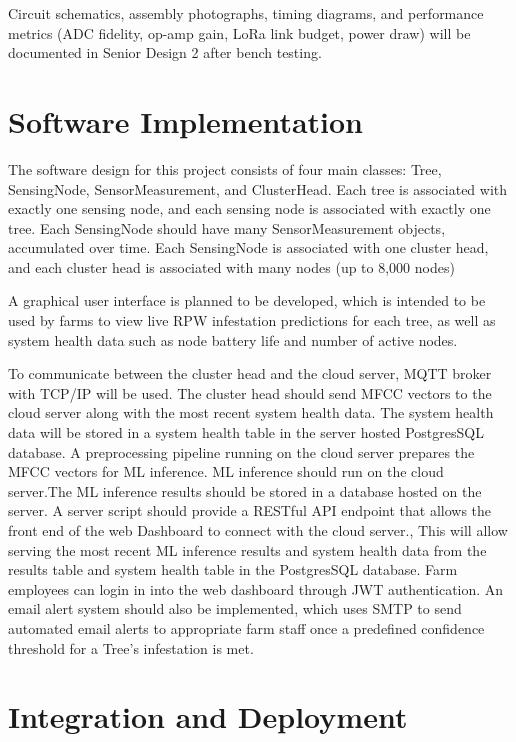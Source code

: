 \documentclass[12pt,a4paper,oneside]{memoir}
\begin{document}
Circuit schematics, assembly photographs, timing diagrams, and performance metrics (ADC fidelity, op-amp gain, LoRa link budget, power draw) will be documented in Senior Design 2 after bench testing.

\section{Software Implementation}
\label{sec:SoftwareImplementation}


The software design for this project consists of four main classes: Tree, SensingNode, SensorMeasurement, and ClusterHead. Each tree is associated with exactly one sensing node, and each sensing node is associated with exactly one tree. Each SensingNode should have many SensorMeasurement objects, accumulated over time. Each SensingNode is associated with one cluster head, and each cluster head is associated with many nodes (up to 8,000 nodes)

A graphical user interface is planned to be developed, which is intended to be used by farms to view live RPW infestation predictions for each tree, as well as system health data such as node battery life and number of active nodes. 

To communicate between the cluster head and the cloud server,  MQTT broker with TCP/IP will be used. The cluster head should send MFCC vectors to the cloud server along with the most recent system health data. The system health data will be stored in a  system health table in the server hosted PostgresSQL database. A preprocessing pipeline running on the cloud server prepares the MFCC vectors for ML inference. ML inference should run on the cloud server.The ML inference results should be stored in a database hosted on the server. A server script should provide a RESTful API endpoint that allows  the front end of the web Dashboard  to connect with the cloud server., This will allow serving the most recent ML inference results and system health data from the results table and system health table in the PostgresSQL database. Farm employees can login in into the web dashboard through JWT authentication. An email alert system should also be implemented, which uses  SMTP to send automated email alerts to appropriate farm staff  once a predefined confidence threshold for a Tree's infestation is met.

\section{Integration and Deployment}
\label{sec:IntegrationDeployment}
\end{document}
